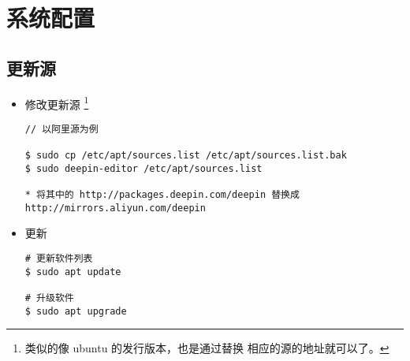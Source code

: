 \chapter{系统配置}
\section{更新源}

\begin{itemize}
\item 修改更新源 \footnote{类似的像 ubuntu 的发行版本，也是通过替换 相应的源的地址就可以了。}
\begin{lstlisting}
// 以阿里源为例
  
$ sudo cp /etc/apt/sources.list /etc/apt/sources.list.bak  
$ sudo deepin-editor /etc/apt/sources.list

* 将其中的 http://packages.deepin.com/deepin 替换成 http://mirrors.aliyun.com/deepin 
\end{lstlisting}

\item 更新
\begin{lstlisting}
# 更新软件列表
$ sudo apt update  

# 升级软件 
$ sudo apt upgrade 
\end{lstlisting}
\end{itemize}